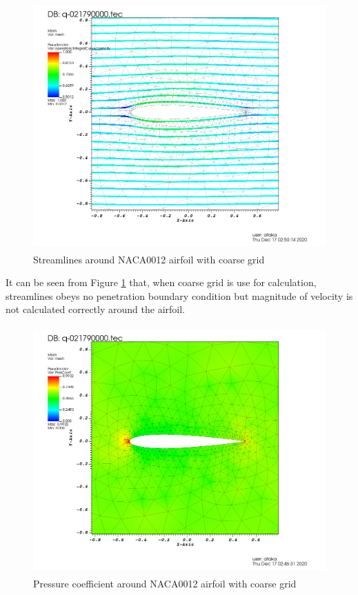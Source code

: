\documentclass[letterpaper,12pt]{article}
\begin{document}
\begin{figure} [!h]
	\centering
	\includegraphics[height = 9.5cm]{graph/coarse/coarse_streamline0000.png}
	\caption{Streamlines around NACA0012 airfoil with coarse grid}
    \label{fig:airfoilcoarsestreamline}
\end{figure}

\newpage

It can be seen from Figure \ref{fig:airfoilcoarsestreamline} that, when coarse grid is 
use for calculation, streamlines obeys no penetration boundary condition but magnitude 
of velocity is not calculated correctly around the airfoil.

\vspace{1cm}

\begin{figure} [!h]
	\centering
	\includegraphics[height = 9.5cm]{graph/coarse/coarse_pressure0000.png}
	\caption{Pressure coefficient around NACA0012 airfoil with coarse grid}
    \label{fig:airfoilcoarsepressure}
\end{figure}
\end{document}
